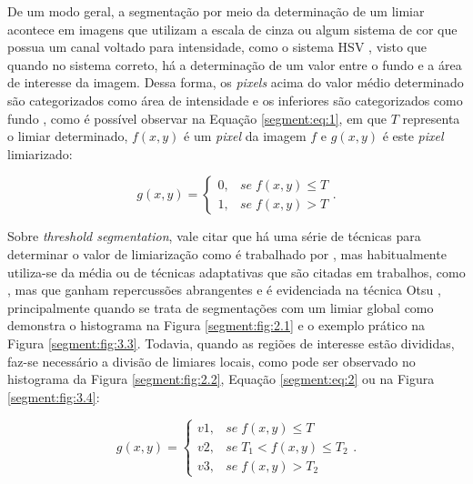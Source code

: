 De um modo geral, a segmentação por meio da determinação de um limiar acontece em imagens que utilizam a escala de cinza ou algum sistema de cor que possua um canal voltado para intensidade, como o sistema HSV \citep{schneider2003experimentos}, visto que quando no sistema correto, há a determinação de um valor entre o fundo e a área de interesse da imagem. Dessa forma, os \textit{pixels} acima do valor médio determinado são categorizados como área de intensidade e os inferiores são categorizados como fundo \citep{pedrini2008analise}, como é possível observar na Equação \ref{segment:eq:1}, em que $T$ representa o limiar determinado, $f(x,y)$ é um \textit{pixel} da imagem $f$ e $g(x,y)$ é este \textit{pixel} limiarizado:

\begin{equation}
\label{segment:eq:1}
    g(x,y) = \begin{cases}
        0,& se \; f(x,y) \leq T \\
        1,& se \; f(x,y) > T
    \end{cases}.
\end{equation}

Sobre \textit{threshold segmentation}, vale citar que há uma série de técnicas para determinar o valor de limiarização como é trabalhado por \cite{Atta2018ImageTechniques}, mas habitualmente utiliza-se da média \citep{Atta2018ImageTechniques, Yanowitz1989, Yuheng2017} ou de técnicas adaptativas que são citadas em trabalhos, como \cite{Yanowitz1989}, mas que ganham repercussões abrangentes e é evidenciada na técnica Otsu \citep{Otsu1979}, principalmente quando se trata de segmentações com um limiar global como demonstra o histograma na Figura \ref{segment:fig:2.1} e o exemplo prático na Figura  \ref{segment:fig:3.3}. Todavia, quando as regiões de interesse estão divididas, faz-se necessário a divisão de limiares locais, como pode ser observado no histograma da Figura \ref{segment:fig:2.2}, Equação \ref{segment:eq:2} ou na Figura \ref{segment:fig:3.4}:

\begin{equation}
\label{segment:eq:2}
    g(x,y) = \begin{cases}
        v1, & se \; f(x,y) \leq T \\ 
        v2, & se \; T_1 < f(x,y) \leq T_2 \\
        v3, & se \; f(x,y) > T_2
    \end{cases}.
\end{equation}

